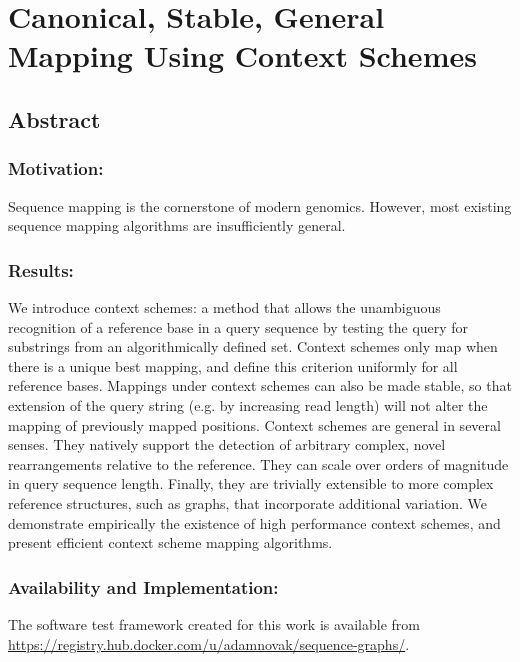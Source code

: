 \setlength{\textfloatsep}{1pt plus 1.0pt}

\newtheorem{theorem}{Theorem}
\newtheorem{lemma}{Lemma}

\chapter{Canonical, Stable, General Mapping Using Context Schemes}
\label{ch:contextschemes}

\section{Abstract}
\subsection{Motivation:}
Sequence mapping is the cornerstone of modern genomics. However, most existing sequence mapping algorithms are insufficiently general.

\subsection{Results:}
We introduce context schemes: a method that allows the unambiguous recognition of a reference base in a query sequence by testing the query for substrings from an algorithmically defined set. Context schemes only map when there is a unique best mapping, and define this criterion uniformly for all reference bases. Mappings under context schemes can also be made stable, so that extension of the query string (e.g. by increasing read length) will not alter the mapping of previously mapped positions. Context schemes are general in several senses. They natively support the detection of arbitrary complex, novel rearrangements relative to the reference. They can scale over orders of magnitude in query sequence length. Finally, they are trivially extensible to more complex reference structures, such as graphs, that incorporate additional variation.
We demonstrate empirically the existence of high performance context schemes, and present efficient context scheme mapping algorithms.

\subsection{Availability and Implementation:}
The software test framework created for this work is available from \url{https://registry.hub.docker.com/u/adamnovak/sequence-graphs/}.

